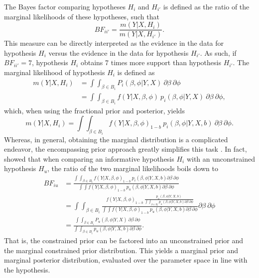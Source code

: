 \documentclass[
  authoryear,
  preprint,
  5p,
  twocolumn]{elsarticle}
\begin{document}
The Bayes factor comparing hypotheses \(H_i\) and \(H_{i'}\) is defined
as the ratio of the marginal likelihoods of these hypotheses, such that
\[
BF_{ii'} = \frac{m(Y | X, H_i)}{m(Y | X, H_{i'})}.
\] This measure can be directly interpreted as the evidence in the data
for hypothesis \(H_i\) versus the evidence in the data for hypothesis
\(H_{i'}\). As such, if \(BF_{ii'} = 7\), hypothesis \(H_i\) obtains 7
times more support than hypothesis \(H_{i'}\). The marginal likelihood
of hypothesis \(H_i\) is defined as \[
\begin{aligned}
m(Y | X, H_i) 
&= \int \int_{\beta \in B_i}  P_i(\beta, \phi | Y, X) ~ \partial \beta ~ \partial \phi \\
&= \int \int_{\beta \in B_i} f(Y | X, \beta, \phi) ~ p_i(\beta, \phi | Y, X) ~ \partial \beta ~ \partial \phi,
\end{aligned}
\] which, when using the fractional prior and posterior, yields \[
m(Y | X, H_i) = 
  \int \int_{\beta \in B_i}  f(Y | X, \beta, \phi)_{1-b} ~ p_i(\beta, \phi | Y, X, b) ~ \partial \beta ~ \partial \phi.
\] Whereas, in general, obtaining the marginal distribution is a
complicated endeavor, the encompassing prior approach greatly simplifies
this task \citep{klugkist_inequality_2005}. In fact,
\citet{gu_approximated_2018} showed that when comparing an informative
hypothesis \(H_i\) with an unconstrained hypothesis \(H_u\), the ratio
of the two marginal likelihoods boils down to \[
\begin{aligned}
BF_{iu} &= 
\frac{
  \int \int_{\beta \in B_i} f (Y | X, \beta, \phi)_{1-b} ~ p_i(\beta, \phi | Y, X, b) \partial \beta ~ \partial \phi
}{
  \int \int f(Y | X, \beta, \phi)_{1-b} ~ p_u(\beta, \phi | Y, X, b) \partial \beta ~ \partial \phi
} \\
&= \int \int_{\beta \in B_i} 
\frac{
  f (Y | X, \beta, \phi)_{1-b} ~  \frac{p_u (\beta, \phi | Y, X, b)}{\int \int_{\beta \in B_i} p_u (\beta, \phi | Y, X, b) \partial \beta ~ \partial \phi}
}{
  \int \int f(Y|X, \beta, \phi)_{1-b} ~ p_u(\beta, \phi | Y, X, b) \partial \beta ~ \partial \phi
} \partial \beta ~ \partial \phi \\
&= \frac{
   \int \int_{\beta \in B_i} P_u(\beta, \phi|Y, X) ~ \partial \beta ~ \partial \phi
}{
  \int\int_{\beta \in B_i} p_u(\beta, \phi | Y, X, b) \partial \beta ~ \partial \phi
}.
\end{aligned}
\] That is, the constrained prior can be factored into an unconstrained
prior and the marginal constrained prior distribution. This yields a
marginal prior and marginal posterior distribution, evaluated over the
parameter space in line with the hypothesis.
\end{document}

